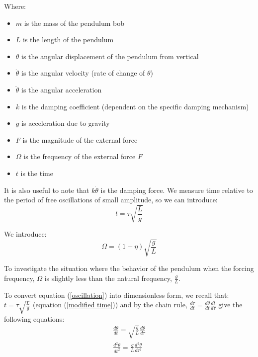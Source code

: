 \documentclass[12pt]{article}
\begin{document}
Where:
\begin{itemize}
    \item $m$ is the mass of the pendulum bob
    \item $L$ is the length of the pendulum
    \item $\theta$ is the angular displacement of the pendulum from vertical
    \item $\dot{\theta}$ is the angular velocity (rate of change of $\theta$)
    \item $\ddot{\theta}$ is the angular acceleration
    \item $k$ is the damping coefficient (dependent on the specific damping mechanism)
    \item $g$ is acceleration due to gravity
    \item $F$ is the magnitude of the external force
    \item $\Omega$ is the frequency of the external force $F$
    \item $t$ is the time
\end{itemize}

It is also useful to note that $k\dot{\theta}$ is the damping force.
We measure time relative to the period of free oscillations of small amplitude, so we can introduce:
\begin{equation}
    t = \tau\sqrt{\frac{L}{g}}
    \label{modified time}
\end{equation}

We introduce:
\begin{equation}
    \Omega = (1 - \eta)\sqrt{\frac{g}{L}}
    \label{modified omega}
\end{equation}

To investigate the situation where the behavior of the pendulum when the forcing frequency, $\Omega$ is slightly less than the natural frequency, $\frac{g}{L}$.

To convert equation (\ref{oscillation}) into dimensionless form, we recall that: $t = \tau\sqrt{\frac{L}{g}}$ (equation (\ref{modified time})) and by the chain rule, $\frac{d\tau}{dt} = \frac{d\theta}{dt}\frac{dt}{d\tau}$ give the following equations:
\begin{equation}
    \begin{split}
        \frac{d\theta}{dt} = \sqrt{\frac{g}{L}}\frac{d\theta}{d\tau} \\
        \frac{d^2\theta}{dt^2} = \frac{g}{L}\frac{d^2\theta}{d\tau^2}
    \end{split}
    \label{chain rules}
\end{equation}
\end{document}

